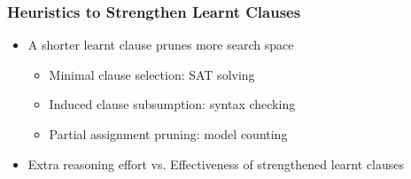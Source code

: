 \begin{frame}
    \frametitle{Heuristics to Strengthen Learnt Clauses}
    \begin{itemize}
        \item A shorter learnt clause prunes more search space
              \begin{itemize}
                  \item Minimal clause selection: SAT solving
                  \item Induced clause subsumption: syntax checking
                  \item Partial assignment pruning: model counting
              \end{itemize}
              \pause
        \item Extra reasoning effort vs. Effectiveness of strengthened learnt clauses
    \end{itemize}
\end{frame}